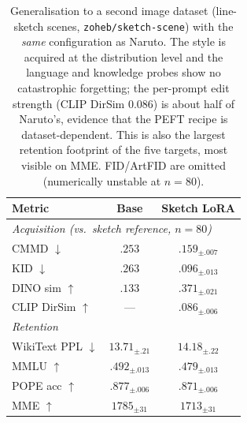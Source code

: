 \documentclass{article}
\begin{document}
\begin{table}[t]
\centering\small
\setlength{\tabcolsep}{8pt}
\begin{tabular}{lcc}
\toprule
Metric & Base & Sketch LoRA \\
\midrule
\multicolumn{3}{l}{\textit{Acquisition (vs.\ sketch reference, $n{=}80$)}}\\
CMMD $\downarrow$      & $.253$ & $\mathbf{.159}_{\pm.007}$ \\
KID $\downarrow$       & $.263$ & $\mathbf{.096}_{\pm.013}$ \\
DINO sim $\uparrow$    & $.133$ & $\mathbf{.371}_{\pm.021}$ \\
CLIP DirSim $\uparrow$ & ---    & $.086_{\pm.006}$ \\
\midrule
\multicolumn{3}{l}{\textit{Retention}}\\
WikiText PPL $\downarrow$ & $13.71_{\pm.21}$ & $14.18_{\pm.22}$ \\
MMLU $\uparrow$           & $.492_{\pm.013}$ & $.479_{\pm.013}$ \\
POPE acc $\uparrow$       & $.877_{\pm.006}$ & $.871_{\pm.006}$ \\
MME $\uparrow$            & $1785_{\pm31}$   & $1713_{\pm31}$ \\
\bottomrule
\end{tabular}
\caption{Generalisation to a second image dataset (line-sketch scenes,
\texttt{zoheb/sketch-scene}) with the \emph{same} configuration as Naruto. The
style is acquired at the distribution level and the language and knowledge probes
show no catastrophic forgetting; the per-prompt edit strength (CLIP DirSim
$0.086$) is about half of Naruto's, evidence that the PEFT recipe is
dataset-dependent. This is also the largest retention footprint of the five
targets, most visible on MME. FID/ArtFID are omitted (numerically unstable at
$n{=}80$).}
\label{tab:sketch}
\end{table}
\end{document}
